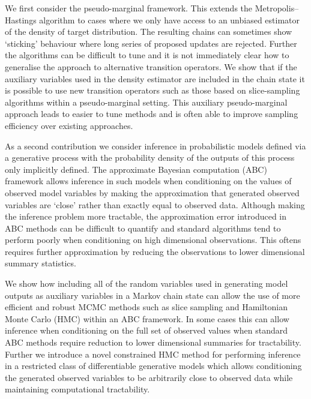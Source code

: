 We first consider the pseudo-marginal framework. This extends the Metropolis–Hastings algorithm to cases where we only have access to an unbiased estimator of the density of target distribution. The resulting chains can sometimes show ‘sticking’ behaviour where long series of proposed updates are rejected. Further the algorithms can be difficult to tune and it is not immediately clear how to generalise the approach to alternative transition operators. We show that if the auxiliary variables used in the density estimator are included in the chain state it is possible to use new transition operators such as those based on slice-sampling algorithms within a pseudo-marginal setting. This auxiliary pseudo-marginal approach leads to easier to tune methods and is often able to improve sampling efficiency over existing approaches.

As a second contribution we consider inference in probabilistic models defined via a generative process with the probability density of the outputs of this process only implicitly defined. The approximate Bayesian computation (ABC) framework allows inference in such models when conditioning on the values of observed model variables by making the approximation that generated observed variables are ‘close’ rather than exactly equal to observed data. Although making the inference problem more tractable, the approximation error introduced in ABC methods can be difficult to quantify and standard algorithms tend to perform poorly when conditioning on high dimensional observations. This oftens requires further approximation by reducing the observations to lower dimensional summary statistics.

We show how including all of the random variables used in generating model outputs as auxiliary variables in a Markov chain state can allow the use of more efficient and robust MCMC methods such as slice sampling and Hamiltonian Monte Carlo (HMC) within an ABC framework. In some cases this can allow inference when conditioning on the full set of observed values when standard ABC methods require reduction to lower dimensional summaries for tractability. Further we introduce a novel constrained HMC method for performing inference in a restricted class of differentiable generative models which allows conditioning the generated observed variables to be arbitrarily close to observed data while maintaining computational tractability.

